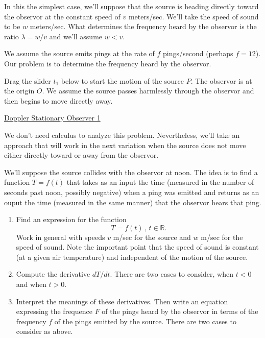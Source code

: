 \documentclass{ximera}
\begin{document}
\begin{example} \label{Exkdfksadfsdt4e4}

In this the simplest case, we'll suppose that the source is heading directly toward the observor at the constant speed of $v$ meters/sec. We'll take the speed of sound to be $w$ meters/sec. What determines the frequency heard by the observor is the ratio $\lambda = w/v$ and we'll assume $w<v$. 

We assume the source emits pings at the rate of $f$ pings/second (perhaps $f=12$). Our problem is to determine the frequency heard by the observor.

Drag the slider $t_1$ below to start the motion of the source $P$. The observor is at the origin $O$. We assume the source passes harmlessly through the observor and then begins to move directly away.


\begin{onlineOnly}
    \begin{center}
\end{center}
\end{onlineOnly}

\href{https://www.desmos.com/calculator/h2rw1sr8li}{Doppler Stationary Observer 1}

We don't need calculus to analyze this problem. Nevertheless, we'll take an approach that will work in the next variation when the source does not move either directly toward or away from the observor.

We'll suppose the source collides with the observor at noon. The idea is to find a function $T=f(t)$ that takes as an input the time (measured in the number of seconds past noon, possibly negative) when a ping was emitted and returns as an ouput the time (measured in the same manner) that the observor hears that ping.

\begin{enumerate}
\item Find an expression for the function 
\[
    T = f(t) \, , \, t \in \mathbb{R}.
\]
Work in general with speeds $v$ m/sec for the source and $w$ m/sec for the speed of sound. Note the important point that the speed of sound is constant (at a given air temperature) and independent of the motion of the source.

\item Compute the derivative $dT/dt$. There are two cases to consider, when $t<0$ and when $t>0$.

\item Interpret the meanings of these derivatives. Then write an equation expressing the frequence $F$ of the pings heard by the observor in terms of the frequency $f$ of the pings emitted by the source. There are two cases to consider as above. 
\end{enumerate}

\end{example}
\end{document}
